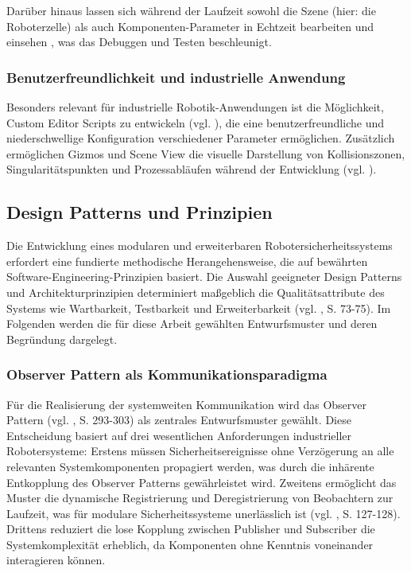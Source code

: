 Darüber hinaus lassen sich während der Laufzeit sowohl die Szene (hier: die
Roboterzelle) als auch Komponenten-Parameter in Echtzeit bearbeiten und
einsehen \cite[S.~1236]{haas_realtime_2022}, was das Debuggen und Testen
beschleunigt.

\subsubsection{Benutzerfreundlichkeit und industrielle Anwendung}

Besonders relevant für industrielle Robotik-Anwendungen ist die Möglichkeit,
Custom Editor Scripts zu entwickeln (vgl.
\cite[S.~156-172]{unity_editors_2023}), die eine benutzerfreundliche und
niederschwellige Konfiguration verschiedener Parameter ermöglichen. Zusätzlich
ermöglichen Gizmos und Scene View die visuelle Darstellung von Kollisionszonen,
Singularitätspunkten und Prozessabläufen während der Entwicklung (vgl.
\cite[S.~234-245]{unity_gizmos_2023}).

\subsection{Design Patterns und Prinzipien}

Die Entwicklung eines modularen und erweiterbaren Robotersicherheitssystems
erfordert eine fundierte methodische Herangehensweise, die auf bewährten
Software-Engineering-Prinzipien basiert. Die Auswahl geeigneter Design Patterns
und Architekturprinzipien determiniert maßgeblich die Qualitätsattribute des
Systems wie Wartbarkeit, Testbarkeit und Erweiterbarkeit (vgl. \cite{Bass2012},
S. 73-75). Im Folgenden werden die für diese Arbeit gewählten Entwurfsmuster
und deren Begründung dargelegt.

\subsubsection{Observer Pattern als Kommunikationsparadigma}
Für die Realisierung der systemweiten Kommunikation wird das Observer Pattern
(vgl. \cite{Gamma1994}, S. 293-303) als zentrales Entwurfsmuster gewählt. Diese
Entscheidung basiert auf drei wesentlichen Anforderungen industrieller
Robotersysteme: Erstens müssen Sicherheitsereignisse ohne Verzögerung an alle
relevanten Systemkomponenten propagiert werden, was durch die inhärente
Entkopplung des Observer Patterns gewährleistet wird. Zweitens ermöglicht das
Muster die dynamische Registrierung und Deregistrierung von Beobachtern zur
Laufzeit, was für modulare Sicherheitssysteme unerlässlich ist (vgl.
\cite{Buschmann1996}, S. 127-128). Drittens reduziert die lose Kopplung
zwischen Publisher und Subscriber die Systemkomplexität erheblich, da
Komponenten ohne Kenntnis voneinander interagieren können.

